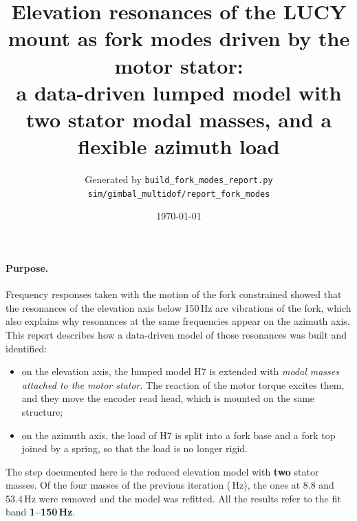 \documentclass[10pt,a4paper]{article}
\title{Elevation resonances of the LUCY mount as fork modes driven by the motor stator:\\ a data-driven lumped model with two stator modal masses, and a flexible azimuth load}
\author{Generated by \texttt{build\_fork\_modes\_report.py}\\ \small\texttt{sim/gimbal\_multidof/report\_fork\_modes}}
\date{\today}
\numberwithin{equation}{section}
\begin{document}
\maketitle

\paragraph{Purpose.} Frequency responses taken with the motion of the fork constrained showed that the resonances of the elevation axis below 150\,Hz are vibrations of the fork, which also explains why resonances at the same frequencies appear on the azimuth axis. This report describes how a data-driven model of those resonances was built and identified:
\begin{itemize}
\item on the elevation axis, the lumped model H7 is extended with \emph{modal masses attached to the motor stator}. The reaction of the motor torque excites them, and they move the encoder read head, which is mounted on the same structure;
\item on the azimuth axis, the load of H7 is split into a fork base and a fork top joined by a spring, so that the load is no longer rigid.
\end{itemize}
The step documented here is the reduced elevation model with \textbf{two} stator masses. Of the four masses of the previous iteration (\massesFour\,Hz), the ones at 8.8 and 53.4\,Hz were removed and the model was refitted. All the results refer to the fit band \textbf{1--150\,Hz}.
\end{document}
